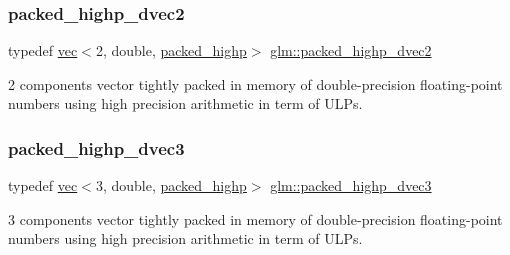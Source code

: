 \mbox{\label{group__gtc__type__aligned_ga8c26414d99b8996aa7dc73e1dc8a06bd}} 
\subsubsection{\texorpdfstring{packed\+\_\+highp\+\_\+dvec2}{packed\_highp\_dvec2}}
{\footnotesize\ttfamily typedef \mbox{\hyperlink{structglm_1_1vec}{vec}}$<$2, double, \mbox{\hyperlink{namespaceglm_a36ed105b07c7746804d7fdc7cc90ff25a8e8791ee77fe079b1291f710d88031bf}{packed\+\_\+highp}}$>$ \mbox{\hyperlink{group__gtc__type__aligned_ga8c26414d99b8996aa7dc73e1dc8a06bd}{glm\+::packed\+\_\+highp\+\_\+dvec2}}}



2 components vector tightly packed in memory of double-\/precision floating-\/point numbers using high precision arithmetic in term of U\+L\+Ps. 

\mbox{\label{group__gtc__type__aligned_ga46950596525c0d1983113ead5f676651}} 
\subsubsection{\texorpdfstring{packed\+\_\+highp\+\_\+dvec3}{packed\_highp\_dvec3}}
{\footnotesize\ttfamily typedef \mbox{\hyperlink{structglm_1_1vec}{vec}}$<$3, double, \mbox{\hyperlink{namespaceglm_a36ed105b07c7746804d7fdc7cc90ff25a8e8791ee77fe079b1291f710d88031bf}{packed\+\_\+highp}}$>$ \mbox{\hyperlink{group__gtc__type__aligned_ga46950596525c0d1983113ead5f676651}{glm\+::packed\+\_\+highp\+\_\+dvec3}}}



3 components vector tightly packed in memory of double-\/precision floating-\/point numbers using high precision arithmetic in term of U\+L\+Ps. 

